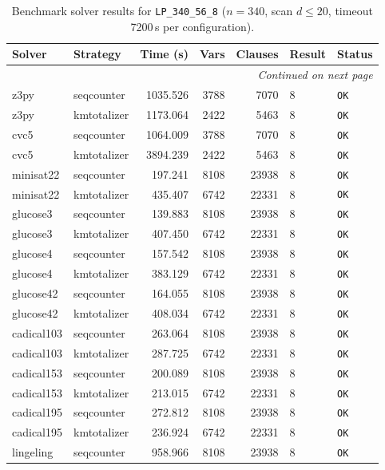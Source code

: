 \begin{longtable}{llrrrl p{}}
\caption{Benchmark solver results for \texttt{LP\_340\_56\_8} ($n=340$, scan $d \leq 20$, timeout 7200\,s per configuration).} \label{tab:bench-LP_340_56_8} \\
\toprule
Solver & Strategy & Time (s) & Vars & Clauses & Result & Status \\
\midrule
\endhead
\midrule
\multicolumn{7}{r}{\textit{Continued on next page}} \\
\midrule
\endfoot
\bottomrule
\endlastfoot
z3py & seqcounter & 1035.526 & 3788 & 7070 & 8 & \texttt{OK} \\
z3py & kmtotalizer & 1173.064 & 2422 & 5463 & 8 & \texttt{OK} \\
cvc5 & seqcounter & 1064.009 & 3788 & 7070 & 8 & \texttt{OK} \\
cvc5 & kmtotalizer & 3894.239 & 2422 & 5463 & 8 & \texttt{OK} \\
minisat22 & seqcounter & 197.241 & 8108 & 23938 & 8 & \texttt{OK} \\
minisat22 & kmtotalizer & 435.407 & 6742 & 22331 & 8 & \texttt{OK} \\
glucose3 & seqcounter & 139.883 & 8108 & 23938 & 8 & \texttt{OK} \\
glucose3 & kmtotalizer & 407.450 & 6742 & 22331 & 8 & \texttt{OK} \\
glucose4 & seqcounter & 157.542 & 8108 & 23938 & 8 & \texttt{OK} \\
glucose4 & kmtotalizer & 383.129 & 6742 & 22331 & 8 & \texttt{OK} \\
glucose42 & seqcounter & 164.055 & 8108 & 23938 & 8 & \texttt{OK} \\
glucose42 & kmtotalizer & 408.034 & 6742 & 22331 & 8 & \texttt{OK} \\
cadical103 & seqcounter & 263.064 & 8108 & 23938 & 8 & \texttt{OK} \\
cadical103 & kmtotalizer & 287.725 & 6742 & 22331 & 8 & \texttt{OK} \\
cadical153 & seqcounter & 200.089 & 8108 & 23938 & 8 & \texttt{OK} \\
cadical153 & kmtotalizer & 213.015 & 6742 & 22331 & 8 & \texttt{OK} \\
cadical195 & seqcounter & 272.812 & 8108 & 23938 & 8 & \texttt{OK} \\
cadical195 & kmtotalizer & 236.924 & 6742 & 22331 & 8 & \texttt{OK} \\
lingeling & seqcounter & 958.966 & 8108 & 23938 & 8 & \texttt{OK} \\

\end{longtable}
